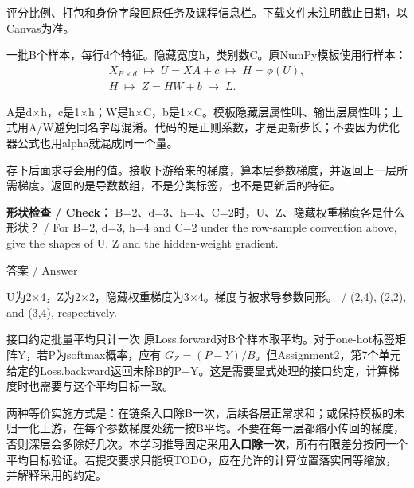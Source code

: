 评分比例、打包和身份字段回原任务及\href{https://crazyshout.github.io/micro-course/notices.html}{课程信息栏}。下载文件未注明截止日期，以Canvas为准。









一批B个样本，每行d个特征。隐藏宽度h，类别数C。原NumPy模板使用行样本：
\[
\begin{gathered}X_{B\times d}\;\longmapsto\;U=XA+c\;\longmapsto\;H=\phi(U),\\
H\;\longmapsto\;Z=HW+b\;\longmapsto\;L.\end{gathered}\tag{A2.1}
\]


A是d\ensuremath{\times}h，c是1\ensuremath{\times}h；W是h\ensuremath{\times}C，b是1\ensuremath{\times}C。模板隐藏层属性叫、输出层属性叫；上式用A/W避免同名字母混淆。代码的是正则系数，才是更新步长；不要因为优化器公式也用alpha就混成同一个量。


存下后面求导会用的值。接收下游给来的梯度，算本层参数梯度，并返回上一层所需梯度。返回的是导数数组，不是分类标签，也不是更新后的特征。


\textbf{形状检查 / Check：} B=2、d=3、h=4、C=2时，U、Z、隐藏权重梯度各是什么形状？ / For B=2, d=3, h=4 and C=2 under the row-sample convention above, give the shapes of U, Z and the hidden-weight gradient.



\begin{StudySolution}{答案 / Answer}


U为2\ensuremath{\times}4，Z为2\ensuremath{\times}2，隐藏权重梯度为3\ensuremath{\times}4。梯度与被求导参数同形。 / (2,4), (2,2), and (3,4), respectively.


\end{StudySolution}








\begin{StudyBlock}{接口约定}{批量平均只计一次}
原Loss.forward对B个样本取平均。对于one-hot标签矩阵Y，若P为softmax概率，应有 \(G_Z=(P-Y)/B\)。但Assignment2，第7个单元给定的Loss.backward返回未除B的P\ensuremath{-}Y。这是需要显式处理的接口约定，计算梯度时也需要与这个平均目标一致。


两种等价实施方式是：在链条入口除B一次，后续各层正常求和；或保持模板的未归一化上游，在每个参数梯度处统一按B平均。不要在每一层都缩小传回的梯度，否则深层会多除好几次。本学习推导固定采用\textbf{入口除一次}，所有有限差分按同一个平均目标验证。若提交要求只能填TODO，应在允许的计算位置落实同等缩放，并解释采用的约定。
\end{StudyBlock}

